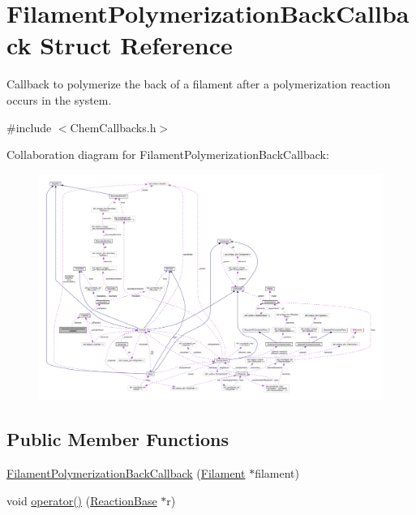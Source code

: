 \hypertarget{structFilamentPolymerizationBackCallback}{\section{Filament\+Polymerization\+Back\+Callback Struct Reference}
\label{structFilamentPolymerizationBackCallback}
}


Callback to polymerize the back of a filament after a polymerization reaction occurs in the system.  




{\ttfamily \#include $<$Chem\+Callbacks.\+h$>$}



Collaboration diagram for Filament\+Polymerization\+Back\+Callback\+:\nopagebreak
\begin{figure}[H]
\begin{center}
\leavevmode
\includegraphics[width=350pt]{structFilamentPolymerizationBackCallback__coll__graph}
\end{center}
\end{figure}
\subsection*{Public Member Functions}
\begin{DoxyCompactItemize}
\item 
\hyperlink{structFilamentPolymerizationBackCallback_a7a592b0a219ddd5849babba5cf931dc8}{Filament\+Polymerization\+Back\+Callback} (\hyperlink{classFilament}{Filament} $\ast$filament)
\item 
void \hyperlink{structFilamentPolymerizationBackCallback_a1f004e2aa43ac80a0dfea4ec07b511a4}{operator()} (\hyperlink{classReactionBase}{Reaction\+Base} $\ast$r)
\end{DoxyCompactItemize}
